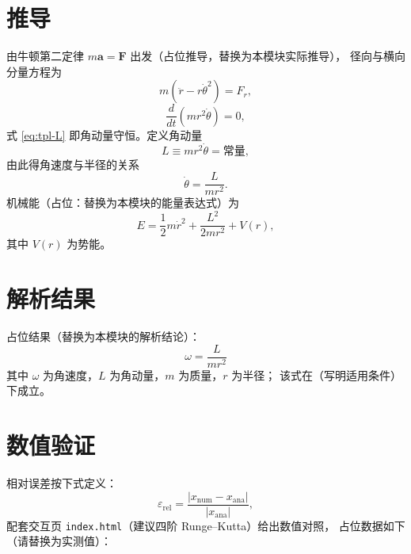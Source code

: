 \documentclass[UTF8,a4paper,11pt]{ctexart}
\begin{document}
\section{推导}\label{sec:derive}
由牛顿第二定律 $m\mathbf a=\mathbf F$ 出发（占位推导，替换为本模块实际推导），
径向与横向分量方程为
\begin{equation}
  m\left(\ddot r - r\dot\theta^{2}\right) = F_r,
  \label{eq:tpl-radial}
\end{equation}
\begin{equation}
  \frac{d}{dt}\left(m r^{2}\dot\theta\right) = 0,
  \label{eq:tpl-L}
\end{equation}
式 \eqref{eq:tpl-L} 即角动量守恒。定义角动量
\begin{equation}
  L \equiv m r^{2}\dot\theta = \text{常量},
  \label{eq:tpl-Ldef}
\end{equation}
由此得角速度与半径的关系
\begin{equation}
  \dot\theta = \frac{L}{m r^{2}}.
  \label{eq:tpl-thetadot}
\end{equation}
机械能（占位：替换为本模块的能量表达式）为
\begin{equation}
  E = \frac{1}{2}m\dot r^{2} + \frac{L^{2}}{2mr^{2}} + V(r),
  \label{eq:tpl-E}
\end{equation}
其中 $V(r)$ 为势能。

\section{解析结果}\label{sec:result}
占位结果（替换为本模块的解析结论）：
\begin{equation}
  \boxed{\ \omega = \frac{L}{m r^{2}} \ }
  \label{eq:tpl-result}
\end{equation}
其中 $\omega$ 为角速度，$L$ 为角动量，$m$ 为质量，$r$ 为半径；
该式在（写明适用条件）下成立。

\section{数值验证}\label{sec:numeric}
相对误差按下式定义：
\begin{equation}
  \varepsilon_{\mathrm{rel}}
  = \frac{\left|x_{\mathrm{num}} - x_{\mathrm{ana}}\right|}
         {\left|x_{\mathrm{ana}}\right|},
  \label{eq:tpl-relerr}
\end{equation}
配套交互页 \texttt{index.html}（建议四阶 Runge--Kutta）给出数值对照，
占位数据如下（请替换为实测值）：
\end{document}
